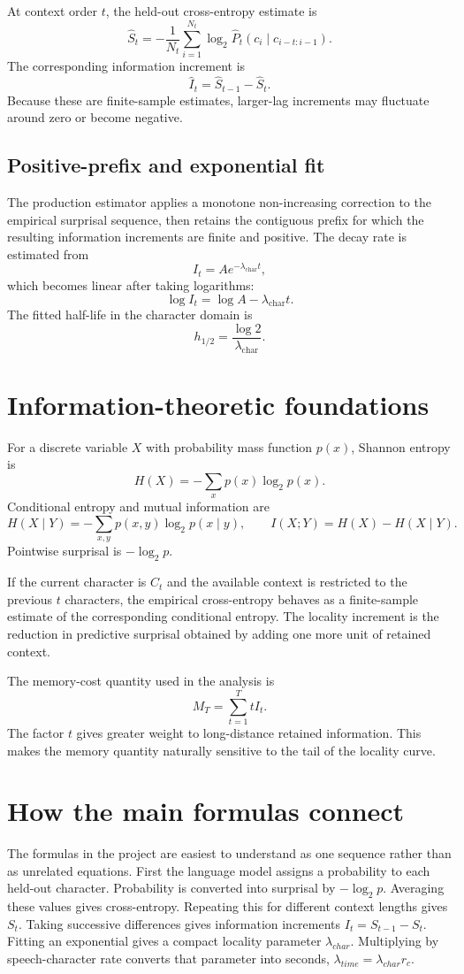 \documentclass[11pt]{article}
\newcommand{\lch}{\lambda_{\mathrm{char}}}
\begin{document}
At context order $t$, the held-out cross-entropy estimate is
\[
\hat S_t=-\frac{1}{N_t}\sum_{i=1}^{N_t}\log_2 \hat P_t(c_i\mid c_{i-t:i-1}).
\]
The corresponding information increment is
\[
\hat I_t=\hat S_{t-1}-\hat S_t.
\]
Because these are finite-sample estimates, larger-lag increments may fluctuate around zero or become negative.

\subsection{Positive-prefix and exponential fit}
The production estimator applies a monotone non-increasing correction to the empirical surprisal sequence, then retains the contiguous prefix for which the resulting information increments are finite and positive. The decay rate is estimated from
\[
I_t=Ae^{-\lch t},
\]
which becomes linear after taking logarithms:
\[
\log I_t=\log A-\lch t.
\]
The fitted half-life in the character domain is
\[
h_{1/2}=\frac{\log 2}{\lch}.
\]

\section{Information-theoretic foundations}
For a discrete variable $X$ with probability mass function $p(x)$, Shannon entropy is
\[
H(X)=-\sum_x p(x)\log_2 p(x).
\]
Conditional entropy and mutual information are
\[
H(X\mid Y)=-\sum_{x,y}p(x,y)\log_2p(x\mid y),
\qquad
I(X;Y)=H(X)-H(X\mid Y).
\]
Pointwise surprisal is $-\log_2 p$.

If the current character is $C_t$ and the available context is restricted to the previous $t$ characters, the empirical cross-entropy behaves as a finite-sample estimate of the corresponding conditional entropy. The locality increment is the reduction in predictive surprisal obtained by adding one more unit of retained context.

The memory-cost quantity used in the analysis is
\[
M_T=\sum_{t=1}^{T}tI_t.
\]
The factor $t$ gives greater weight to long-distance retained information. This makes the memory quantity naturally sensitive to the tail of the locality curve.

\section{How the main formulas connect}\label{sec:formula-connection}
The formulas in the project are easiest to understand as one sequence rather than as unrelated equations. First the language model assigns a probability to each held-out character. Probability is converted into surprisal by $-\log_2 p$. Averaging these values gives cross-entropy. Repeating this for different context lengths gives $S_t$. Taking successive differences gives information increments $I_t=S_{t-1}-S_t$. Fitting an exponential gives a compact locality parameter $\lambda_{char}$. Multiplying by speech-character rate converts that parameter into seconds, $\lambda_{time}=\lambda_{char}r_c$.
\end{document}
